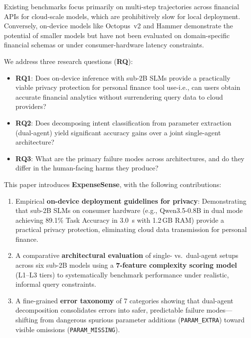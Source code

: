 \documentclass[11pt,twocolumn]{article}
\begin{document}
Existing benchmarks \citep{qin2023toolllm,
finmcpbench2026, fintrace2026} focus primarily on multi-step trajectories across financial APIs for cloud-scale models,
which are prohibitively slow for local deployment.
Conversely, on-device models like Octopus~v2 \citep{chen2024octopus}
and Hammer \citep{lin2024hammer} demonstrate the potential of smaller
models but have not been evaluated on domain-specific financial
schemas or under consumer-hardware latency constraints.

We address three research questions (\textbf{RQ}):

\begin{itemize}\itemsep=0pt \parskip=0pt \parsep=0pt
  \item \textbf{RQ1}: Does on-device inference with sub-2B SLMs
        provide a practically viable privacy protection for personal
        finance tool use-i.e., can users obtain accurate financial
        analytics without surrendering query data to cloud providers?
  \item \textbf{RQ2}: Does decomposing intent classification from
        parameter extraction (dual-agent) yield significant accuracy
        gains over a joint single-agent architecture?
  \item \textbf{RQ3}: What are the primary failure modes across
        architectures, and do they differ in the human-facing harms
        they produce?
\end{itemize}

This paper introduces \textbf{ExpenseSense}, with the following
contributions:

\begin{enumerate}
    \item Empirical \textbf{on-device deployment guidelines for
          privacy}: Demonstrating that sub-2B SLMs on consumer hardware
          (e.g., Qwen3.5-0.8B in dual mode achieving 89.1\% Task Accuracy
          in 3.0~s with 1.2\,GB RAM) provide a practical privacy protection,
          eliminating cloud data transmission for personal finance.

    \item A comparative \textbf{architectural evaluation} of single- vs.\
          dual-agent setups across six sub-2B models using a \textbf{7-feature
          complexity scoring model} (L1--L3 tiers) to systematically benchmark
          performance under realistic, informal query constraints.

    \item A fine-grained \textbf{error taxonomy} of 7 categories showing
          that dual-agent decomposition consolidates errors into safer, predictable
          failure modes---shifting from dangerous spurious parameter additions
          (\texttt{PARAM\_EXTRA}) toward visible omissions (\texttt{PARAM\_MISSING}).
\end{enumerate}
\end{document}

